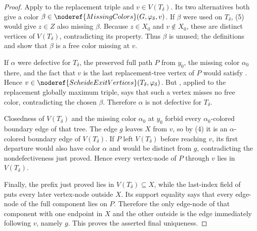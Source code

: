 \begin{proof}
Apply  to the replacement
triple and $v\in V(T_\delta)$.  Its two alternatives both give a color
$\beta\in\noderef{MissingColors}(G,\varphi_\delta,v)$.  If $\beta$ were
used on $T_\delta$, (5) would give $z\in Z$ also missing $\beta$.
Because $z\in X_0$ and $v\notin X_0$, these are distinct vertices of
$V(T_\delta)$, contradicting its
 property.  Thus $\beta$ is unused;
the definitions  and
 show that $\beta$ is a free color missing at
$v$.

If $\alpha$ were defective for $T_\delta$, the preserved full path $P$
from $y_0$, the missing color $\alpha_0$ there, and the fact that $v$ is
the last replacement-tree vertex of $P$ would satisfy
.  Hence
$v\in\noderef{ScheideExitVertices}(T_\delta,\varphi_\delta)$.  But
, applied to the replacement globally maximum
triple, says that such a vertex misses no free color, contradicting the
chosen $\beta$.  Therefore $\alpha$ is not defective for
$T_\delta$.

Closedness of $V(T_\delta)$ and the missing color $\alpha_0$ at $y_0$
forbid every $\alpha_0$-colored boundary edge of that tree.  The edge
$g$ leaves $X$ from $v$, so by (4) it is an $\alpha$-colored boundary
edge of $V(T_\delta)$.  If $P$ left $V(T_\delta)$ before reaching $v$,
its first departure would also have color $\alpha$ and would be distinct
from $g$, contradicting the nondefectiveness just proved.  Hence every
vertex-node of $P$ through $v$ lies in $V(T_\delta)$.

Finally, the prefix just proved lies in $V(T_\delta)\subseteq X$, while
the last-index field of  puts every later
vertex-node outside $X$.  Its support equality says that every edge-node
of the full component lies on $P$.  Therefore the only edge-node of that
component with one endpoint in $X$ and the other outside is the edge
immediately following $v$, namely $g$.  This proves the asserted final
uniqueness.
\end{proof}
